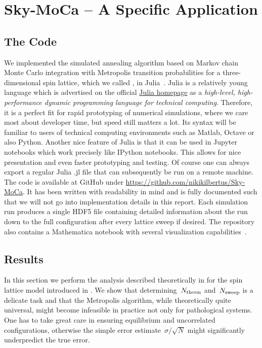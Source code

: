 %
\chapter{Sky-MoCa -- A Specific Application}\label{chap:2}
%
\section{The Code}\label{sec:code}
%
We implemented the simulated annealing algorithm based on Markov chain Monte
Carlo integration with Metropolis transition probabilities for a
three-dimensional spin lattice, which we called , in
Julia~\cite{julia}. Julia is a relatively young language which is advertised on
the official \href{http://julialang.org/}{Julia homepage} as a \emph{high-level,
high-performance dynamic programming language for technical computing}.
Therefore, it is a perfect fit for rapid prototyping of numerical simulations,
where we care most about developer time, but speed still matters a lot. Its
syntax will be familiar to users of technical computing environments such as
Matlab, Octave or also Python. Another nice feature of Julia is that it can be
used in Jupyter notebooks which work precisely like IPython notebooks. This
allows for nice presentation and even faster prototyping and testing. Of course
one can always export a regular Julia \textsf{.jl} file that can subsequently be
run on a remote machine. The code is available at GitHub under
\href{https://github.com/nikikilbertus/Sky-MoCa}{\textsf{https://github.com/nikikilbertus/Sky-MoCa}}.
It has been written with readability in mind and is fully documented such that
we will not go into implementation details in this report. Each simulation run
produces a single HDF5 file containing detailed information about the run down
to the full configuration after every lattice sweep if desired. The repository
also contains a Mathematica notebook with several visualization
capabilities~\cite{mathematica}.
%
\section{Results}\label{sec:results}
%
In this section we perform the analysis described theoretically in
 for the spin lattice model introduced in
. We show that determining~$N_{\mathrm{therm}}$ and~$N_{\mathrm{sweep}}$ is a
delicate task and that the Metropolis algorithm, while theoretically quite
universal, might become infeasible in practice not only for pathological
systems. One has to take great care in ensuring equilibrium and uncorrelated
configurations, otherwise the simple error estimate~$\sigma/\sqrt{N}$ might
significantly underpredict the true error.

